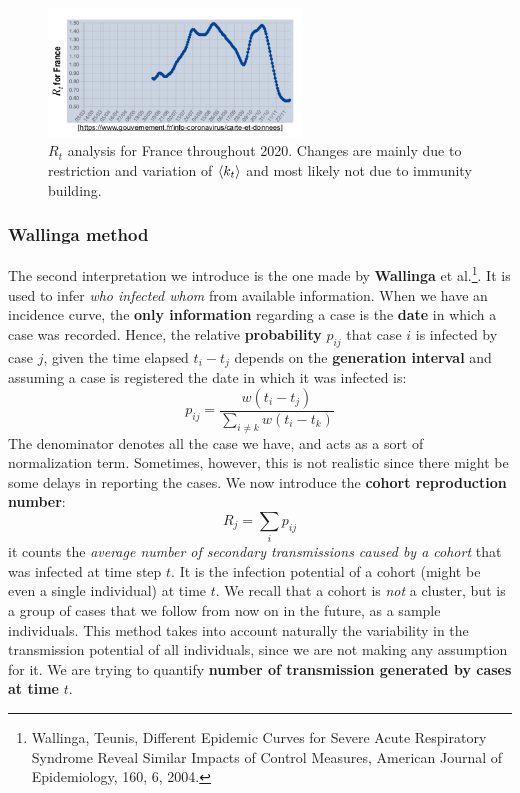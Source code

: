 \documentclass[../main/main.tex]{subfiles}
\begin{document}
\begin{figure}[h!]
\centering
\includegraphics[width=0.60\textwidth]{../lessons/image/22/image06.png}
\caption{\label{fig:22_06} $R_t$ analysis for France throughout 2020. Changes are mainly due to restriction and variation of $\expval{k_t}$ and most likely not due to immunity building.}
\end{figure}


\subsubsection{Wallinga method}

The second interpretation we introduce is the one made by \textbf{Wallinga} et al.\footnote{Wallinga, Teunis, Different Epidemic Curves for Severe Acute Respiratory Syndrome Reveal Similar Impacts of Control Measures, American Journal of Epidemiology, 160, 6, 2004.}. It is used to infer \textit{who infected whom} from available information. When we have an incidence curve, the \textbf{only information} regarding a case is the \textbf{date} in which a case was recorded. Hence, the relative \textbf{probability} $p_{ij}$ that case $i$ is infected by case $j$, given the time elapsed $t_i - t_j$ depends on the \textbf{generation interval} and assuming a case is registered the date in which it was infected is:
\begin{equation}
    p_{ij} = \frac{w(t_i - t_j)}{\sum_{i \neq k} w(t_i - t_k) }
\end{equation}
The denominator denotes all the case we have, and acts as a sort of normalization term. Sometimes, however, this is not realistic since there might be some delays in reporting the cases. We now introduce the \textbf{cohort reproduction number}:
\begin{equation}
    R_j = \sum_i p_{ij}
\end{equation}
it counts the \textit{average number of secondary transmissions caused by a cohort} that was infected at time step $t$. It is the infection potential of a cohort (might be even a single individual) at time $t$. We recall that a cohort is \textit{not} a cluster, but is a group of cases that we follow from now on in the future, as a sample individuals. This method takes into account naturally the variability in the transmission potential of all individuals, since we are not making any assumption for it. We are trying to quantify \textbf{number of transmission generated by cases at time }$t$.
\end{document}
